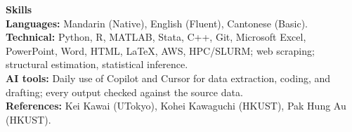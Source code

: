 \documentclass[11pt,letterpaper]{article}
\begin{document}
\vspace{1pt}

{\large \textbf{Skills}}\\[1pt]
\textbf{Languages:} Mandarin (Native), English (Fluent), Cantonese (Basic).\\
\textbf{Technical:} Python, R, MATLAB, Stata, C++, Git, Microsoft Excel, PowerPoint, Word, HTML, \LaTeX, AWS, HPC/SLURM; web scraping; structural estimation, statistical inference.\\
\textbf{AI tools:} Daily use of Copilot and Cursor for data extraction, coding, and drafting; every output checked against the source data.\\
\textbf{References:} Kei Kawai (UTokyo), Kohei Kawaguchi (HKUST), Pak Hung Au (HKUST).
\end{document}
